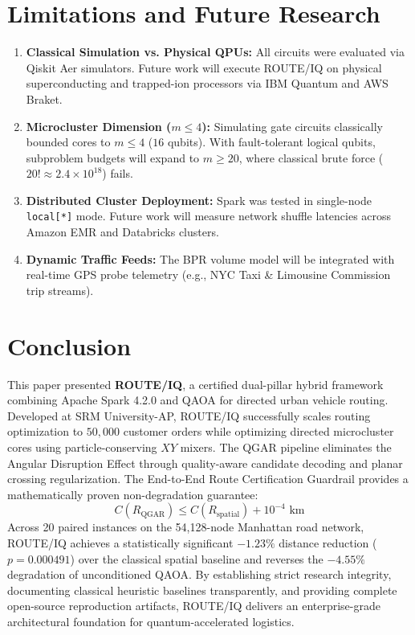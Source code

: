 \documentclass[journal,10pt]{IEEEtran}
\begin{document}
\section{Limitations and Future Research}
\begin{enumerate}
    \item \textbf{Classical Simulation vs. Physical QPUs:} All circuits were evaluated via Qiskit Aer simulators. Future work will execute ROUTE/IQ on physical superconducting and trapped-ion processors via IBM Quantum and AWS Braket.
    \item \textbf{Microcluster Dimension ($m \le 4$):} Simulating gate circuits classically bounded cores to $m \le 4$ ($16$ qubits). With fault-tolerant logical qubits, subproblem budgets will expand to $m \ge 20$, where classical brute force ($20! \approx 2.4 \times 10^{18}$) fails.
    \item \textbf{Distributed Cluster Deployment:} Spark was tested in single-node \texttt{local[*]} mode. Future work will measure network shuffle latencies across Amazon EMR and Databricks clusters.
    \item \textbf{Dynamic Traffic Feeds:} The BPR volume model will be integrated with real-time GPS probe telemetry (e.g., NYC Taxi \& Limousine Commission trip streams).
\end{enumerate}

\section{Conclusion}
This paper presented \textbf{ROUTE/IQ}, a certified dual-pillar hybrid framework combining Apache Spark 4.2.0 and QAOA for directed urban vehicle routing. Developed at SRM University-AP, ROUTE/IQ successfully scales routing optimization to $50,000$ customer orders while optimizing directed microcluster cores using particle-conserving $XY$ mixers. The QGAR pipeline eliminates the Angular Disruption Effect through quality-aware candidate decoding and planar crossing regularization. The End-to-End Route Certification Guardrail provides a mathematically proven non-degradation guarantee:
\[
C(R_{\text{QGAR}}) \le C(R_{\text{spatial}}) + 10^{-4}\text{ km}
\]
Across 20 paired instances on the 54,128-node Manhattan road network, ROUTE/IQ achieves a statistically significant $-1.23\%$ distance reduction ($p = 0.000491$) over the classical spatial baseline and reverses the $-4.55\%$ degradation of unconditioned QAOA. By establishing strict research integrity, documenting classical heuristic baselines transparently, and providing complete open-source reproduction artifacts, ROUTE/IQ delivers an enterprise-grade architectural foundation for quantum-accelerated logistics.
\end{document}
